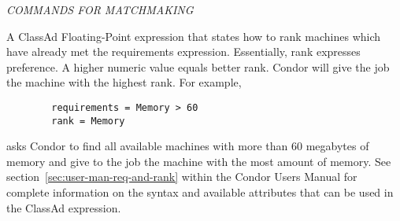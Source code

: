 \begin{description}
\end{description} 


\emph{COMMANDS FOR MATCHMAKING}
\begin{description} 


\item[rank = $<$ClassAd Float Expression$>$]
A ClassAd Floating-Point
expression that states how to rank machines which have already met the requirements
expression. Essentially, rank expresses preference.  A higher numeric value
equals better rank. Condor will give the job the machine with the
highest rank.  For example,
\begin{verbatim}
        requirements = Memory > 60
        rank = Memory
\end{verbatim}
asks Condor to find all available machines with more than 60 megabytes of memory
and give to the job the machine with the most amount of memory.
See section~\ref{sec:user-man-req-and-rank} 
within the Condor Users
Manual for complete information on the syntax and available attributes
that can be used in the ClassAd expression.



\end{description}
